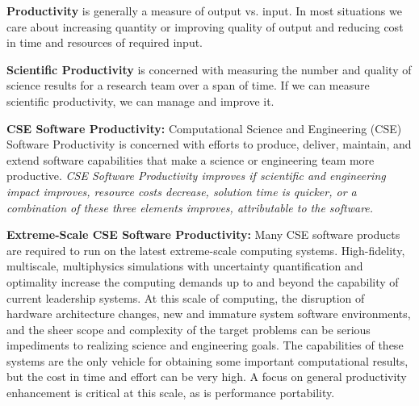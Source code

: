\documentclass[]{article}
\date{}
\begin{document}
\pagestyle{fancy}
\renewcommand{\headrulewidth}{0pt}
  
\thispagestyle{empty}
\textbf{\newline}
\textbf{\newline}
\textbf{\newline}

\textbf{Productivity} is generally a measure of output vs. input. In
most situations we care about increasing quantity or improving quality
of output and reducing cost in time and resources of required input.

\textbf{Scientific Productivity} is concerned with measuring the number
and quality of science results for a research team over a span of time.
If we can measure scientific productivity, we can manage and improve it.

\textbf{CSE Software Productivity:} Computational Science and
Engineering (CSE) Software Productivity is concerned with efforts to
produce, deliver, maintain, and extend software capabilities that make a
science or engineering team more productive. \emph{CSE Software
Productivity improves if scientific and engineering impact improves,
resource costs decrease, solution time is quicker, or a combination of
these three elements improves, attributable to the software.}

\textbf{Extreme-Scale CSE Software Productivity:} Many CSE software
products are required to run on the latest extreme-scale computing
systems. High-fidelity, multiscale, multiphysics simulations with
uncertainty quantification and optimality increase the computing demands
up to and beyond the capability of current leadership systems. At this
scale of computing, the disruption of hardware architecture changes, new
and immature system software environments, and the sheer scope and
complexity of the target problems can be serious impediments to
realizing science and engineering goals. The capabilities of these
systems are the only vehicle for obtaining some important computational
results, but the cost in time and effort can be very high. A focus on
general productivity enhancement is critical at this scale, as is
performance portability.
\end{document}
